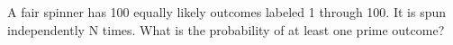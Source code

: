 A fair spinner has 100 equally likely outcomes labeled 1 through 100. It is spun independently N times. What is the probability of at least one prime outcome?
